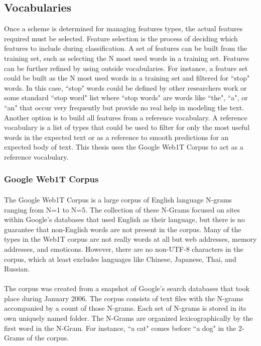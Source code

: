 	\subsection {Vocabularies} Once a scheme is determined for managing features types, the actual features required must be selected. Feature selection is the process of deciding which features to include during classification. A set of features can be built from the training set, such as selecting the N most used words in a training set.  Features can be further refined by using outside vocabularies.  For instance, a feature set could be built as the N most used words in a training set and filtered for ``stop" words.  In this case, ``stop" words could be defined by other researchers work or some standard ``stop word" list where ``stop words" are words like ``the", ``a", or ``an" that occur very frequently but provide no real help in modeling the text.  Another option is to build all features from a reference vocabulary.  A reference vocabulary is a list of types that could be used to filter for only the most useful words in the expected text or as a reference to smooth predictions for an expected body of text. This thesis uses the Google Web1T Corpus to act as a reference vocabulary.

	\subsubsection{Google Web1T Corpus}
		\paragraph{} The Google Web1T Corpus is a large corpus of English language N-grams ranging from N=1 to N=5. The collection of these N-Grams focused on sites within Google's databases that used English as their language, but there is no guarantee that non-English words are not present in the corpus.  Many of the types in the Web1T corpus are not really words at all but web addresses, memory addresses, and emoticons. However, there are no non-UTF-8 characters in the corpus, which at least excludes languages like Chinese, Japanese, Thai, and Russian. 
		\paragraph{} The corpus was created from a snapshot of Google's search databases that took place during January 2006.  The corpus consists of text files with the N-grams accompanied by a count of those N-grams.  Each set of N-grams is stored in its own uniquely named folder.  The N-Grams are organized lexicographically by the first word in the N-Gram.  For instance, ``a cat" comes before ``a dog" in the 2-Grams of the corpus.  
